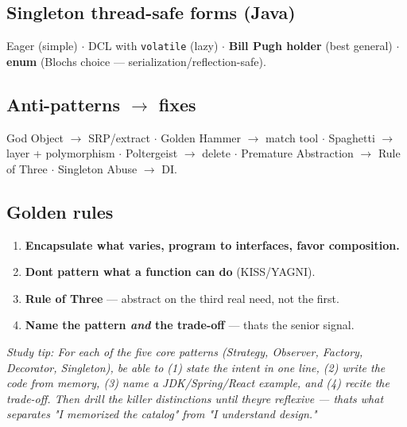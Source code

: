 \documentclass[11pt]{article}
\providecommand{\tightlist}{\setlength{\itemsep}{1pt}\setlength{\parskip}{0pt}}
\begin{document}
\subsection{Singleton thread-safe forms (Java)}\label{singleton-thread-safe-forms-java}

Eager (simple) \(\cdot\) DCL with \texttt{volatile} (lazy) \(\cdot\) \textbf{Bill Pugh holder} (best general) \(\cdot\) \textbf{enum} (Bloch\textquotesingle s choice --- serialization/reflection-safe).

\subsection{\texorpdfstring{Anti-patterns \(\rightarrow\) fixes}{Anti-patterns \textbackslash rightarrow fixes}}\label{anti-patterns-rightarrow-fixes}

God Object \(\rightarrow\) SRP/extract \(\cdot\) Golden Hammer \(\rightarrow\) match tool \(\cdot\) Spaghetti \(\rightarrow\) layer + polymorphism \(\cdot\) Poltergeist \(\rightarrow\) delete \(\cdot\) Premature Abstraction \(\rightarrow\) Rule of Three \(\cdot\) Singleton Abuse \(\rightarrow\) DI.

\subsection{Golden rules}\label{golden-rules}

\begin{enumerate}
\def\labelenumi{\arabic{enumi}.}
\tightlist
\item
  \textbf{Encapsulate what varies, program to interfaces, favor composition.}
\item
  \textbf{Don\textquotesingle t pattern what a function can do} (KISS/YAGNI).
\item
  \textbf{Rule of Three} --- abstract on the third real need, not the first.
\item
  \textbf{Name the pattern \emph{and} the trade-off} --- that\textquotesingle s the senior signal.
\end{enumerate}

\emph{Study tip: For each of the five core patterns (Strategy, Observer, Factory, Decorator, Singleton), be able to (1) state the intent in one line, (2) write the code from memory, (3) name a JDK/Spring/React example, and (4) recite the trade-off. Then drill the killer distinctions until they\textquotesingle re reflexive --- that\textquotesingle s what separates "I memorized the catalog" from "I understand design."}
\end{document}
